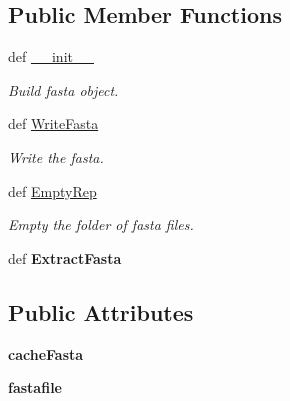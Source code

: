\subsection*{\-Public \-Member \-Functions}
\begin{DoxyCompactItemize}
\item 
\hypertarget{classMycarn_1_1Fasta_1_1Fasta_a3aa5abf8c8cf8b1dfbadfe2521f95530}{
def \hyperlink{classMycarn_1_1Fasta_1_1Fasta_a3aa5abf8c8cf8b1dfbadfe2521f95530}{\-\_\-\-\_\-init\-\_\-\-\_\-}}
\label{classMycarn_1_1Fasta_1_1Fasta_a3aa5abf8c8cf8b1dfbadfe2521f95530}

\begin{DoxyCompactList}\small\item\em \-Build fasta object. \end{DoxyCompactList}\item 
\hypertarget{classMycarn_1_1Fasta_1_1Fasta_af07a46432a6d670ad5e47274f47d8ef4}{
def \hyperlink{classMycarn_1_1Fasta_1_1Fasta_af07a46432a6d670ad5e47274f47d8ef4}{\-Write\-Fasta}}
\label{classMycarn_1_1Fasta_1_1Fasta_af07a46432a6d670ad5e47274f47d8ef4}

\begin{DoxyCompactList}\small\item\em \-Write the fasta. \end{DoxyCompactList}\item 
def \hyperlink{classMycarn_1_1Fasta_1_1Fasta_ae48a19051f56985b3ccbf6706dc78409}{\-Empty\-Rep}
\begin{DoxyCompactList}\small\item\em \-Empty the folder of fasta files. \end{DoxyCompactList}\item 
\hypertarget{classMycarn_1_1Fasta_1_1Fasta_a77a08d76a0ecdb97905b3df3c2896d52}{
def {\bfseries \-Extract\-Fasta}}
\label{classMycarn_1_1Fasta_1_1Fasta_a77a08d76a0ecdb97905b3df3c2896d52}

\end{DoxyCompactItemize}
\subsection*{\-Public \-Attributes}
\begin{DoxyCompactItemize}
\item 
\hypertarget{classMycarn_1_1Fasta_1_1Fasta_ae0a95f78e710d6dc4366bfec7d185ea8}{
{\bfseries cache\-Fasta}}
\label{classMycarn_1_1Fasta_1_1Fasta_ae0a95f78e710d6dc4366bfec7d185ea8}

\item 
\hypertarget{classMycarn_1_1Fasta_1_1Fasta_ac222e54ebec9a0530974fa7331e2061b}{
{\bfseries fastafile}}
\label{classMycarn_1_1Fasta_1_1Fasta_ac222e54ebec9a0530974fa7331e2061b}

\end{DoxyCompactItemize}
